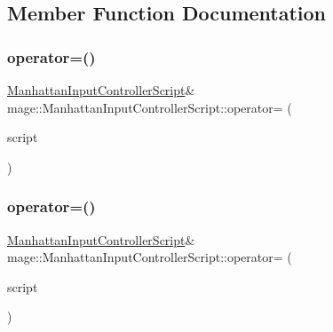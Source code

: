 \subsection{Member Function Documentation}
\hypertarget{classmage_1_1_manhattan_input_controller_script_a07fdb2fee8a1eb793c2d54853c9e4998}{}\label{classmage_1_1_manhattan_input_controller_script_a07fdb2fee8a1eb793c2d54853c9e4998} 
\subsubsection{\texorpdfstring{operator=()}{operator=()}\hspace{0.1cm}{\footnotesize\ttfamily [1/2]}}
{\footnotesize\ttfamily \hyperlink{classmage_1_1_manhattan_input_controller_script}{Manhattan\+Input\+Controller\+Script}\& mage\+::\+Manhattan\+Input\+Controller\+Script\+::operator= (\begin{DoxyParamCaption}\item[{const \hyperlink{classmage_1_1_manhattan_input_controller_script}{Manhattan\+Input\+Controller\+Script} \&}]{script }\end{DoxyParamCaption})\hspace{0.3cm}{\ttfamily [delete]}}

\hypertarget{classmage_1_1_manhattan_input_controller_script_acea874b94a4531c393af739824012a1a}{}\label{classmage_1_1_manhattan_input_controller_script_acea874b94a4531c393af739824012a1a} 
\subsubsection{\texorpdfstring{operator=()}{operator=()}\hspace{0.1cm}{\footnotesize\ttfamily [2/2]}}
{\footnotesize\ttfamily \hyperlink{classmage_1_1_manhattan_input_controller_script}{Manhattan\+Input\+Controller\+Script}\& mage\+::\+Manhattan\+Input\+Controller\+Script\+::operator= (\begin{DoxyParamCaption}\item[{\hyperlink{classmage_1_1_manhattan_input_controller_script}{Manhattan\+Input\+Controller\+Script} \&\&}]{script }\end{DoxyParamCaption})\hspace{0.3cm}{\ttfamily [delete]}}

